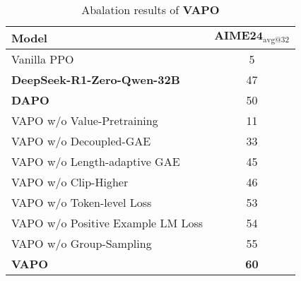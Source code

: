 
\setcounter{table}{0}
\begin{table}[t]
    \centering
    \caption{Abalation results of \textbf{VAPO}}
    \begin{tabular}{l c}
        \toprule
        \textbf{Model} & $\textbf{AIME24}_\text{avg@32}$ \\
        \midrule
        Vanilla PPO & 5 \\
        \textbf{DeepSeek-R1-Zero-Qwen-32B}  & 47 \\
        \textbf{DAPO} & 50 \\
        \midrule
        VAPO w/o Value-Pretraining & 11 \\
        VAPO w/o Decoupled-GAE & 33 \\
        VAPO w/o Length-adaptive GAE & 45 \\
        VAPO w/o Clip-Higher & 46 \\
        VAPO w/o Token-level Loss & 53 \\
        VAPO w/o Positive Example LM Loss & 54 \\
        VAPO w/o Group-Sampling & 55 \\
        \textbf{VAPO} & \textbf{60} \\
        \bottomrule
    \end{tabular}
    \label{tab:results}
\end{table}
